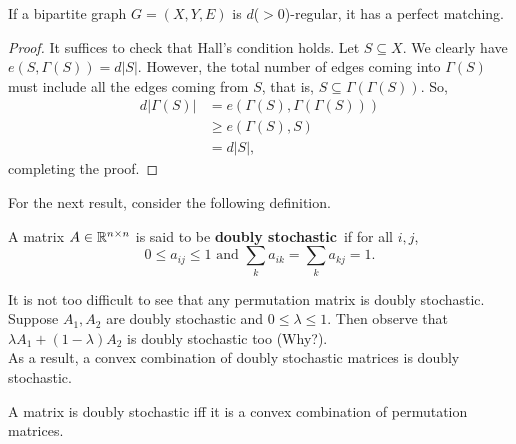 		\begin{ftheo}
			If a bipartite graph $G=(X,Y,E)$ is $d$($>0$)-regular, it has a perfect matching.
		\end{ftheo}
		\begin{proof}
			It suffices to check that Hall's condition holds. Let $S\subseteq X$. We clearly have $e(S,\Gamma(S))=d|S|$. However, the total number of edges coming into $\Gamma(S)$ must include all the edges coming from $S$, that is, $S\subseteq\Gamma(\Gamma(S))$. So,
			\begin{align*}
				d|\Gamma(S)| &= e(\Gamma(S),\Gamma(\Gamma(S))) \\
					&\ge e(\Gamma(S),S) \\
					&= d|S|,
			\end{align*}
			completing the proof.
		\end{proof}

		For the next result, consider the following definition.

		\begin{fdef}
			A matrix $A\in\mathbb{R}^{n\times n}$ is said to be \textbf{doubly stochastic}\footnotemark\ if for all $i,j$,
			\[ 0\le a_{ij} \le 1 \text{ and } \sum_{k} a_{ik} = \sum_{k} a_{kj} = 1. \]
		\end{fdef}

		It is not too difficult to see that any permutation matrix is doubly stochastic.\\
		Suppose $A_1,A_2$ are doubly stochastic and $0\le\lambda\le 1$. Then observe that $\lambda A_1 + (1-\lambda)A_2$ is doubly stochastic too (Why?).\\
		As a result, a convex combination of doubly stochastic matrices is doubly stochastic.

		\begin{ftheo}
			A matrix is doubly stochastic iff it is a convex combination of permutation matrices.
		\end{ftheo}